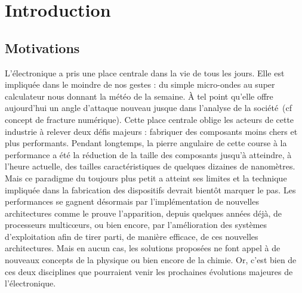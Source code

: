 \chapter*{Introduction}
\setcounter{figure}{0}

\section*{Motivations}
L'électronique a pris une place centrale dans la vie de tous les jours. Elle est impliquée dans le moindre de nos gestes : du simple micro-ondes au super calculateur nous donnant la météo de la semaine. À tel point qu'elle offre aujourd'hui un angle d'attaque nouveau jusque dans l'analyse de la société~(cf concept de fracture numérique). Cette place centrale oblige les acteurs de cette industrie à relever deux défis majeurs : fabriquer des composants moins chers et plus performants. Pendant longtemps, la pierre angulaire de cette course à la performance a été la réduction de la taille des composants jusqu'à atteindre, à l'heure actuelle, des tailles caractéristiques de quelques dizaines de nanomètres. Mais ce paradigme du toujours plus petit a atteint ses limites et la technique impliquée dans la fabrication des dispositifs devrait bientôt marquer le pas. Les performances se gagnent désormais par l'implémentation de nouvelles architectures comme le prouve l'apparition, depuis quelques années déjà, de processeurs multicœurs, ou bien encore, par l'amélioration des systèmes d'exploitation afin de tirer parti, de manière efficace, de ces nouvelles architectures. Mais en aucun cas, les solutions proposées ne font appel à de nouveaux concepts de la physique ou bien encore de la chimie. Or, c'est bien de ces deux disciplines que pourraient venir les prochaines évolutions majeures de l'électronique.

